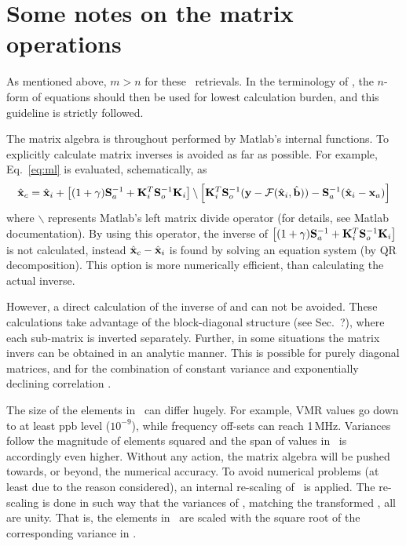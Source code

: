 \section{Some notes on the matrix operations}
\label{sec:matrixops}
%
As mentioned above, $m>n$ for these \smr\ retrievals. In the terminology of 
\citet{rodgers:00}, the $n$-form of equations should then be used for lowest
calculation burden, and this guideline is strictly followed.

The matrix algebra is throughout performed by Matlab's internal functions. To
explicitly calculate matrix inverses is avoided as far as possible. For
example, Eq.~\ref{eq:ml} is evaluated, schematically, as
\begin{displaymath}
  \hat{\mathbf{x}}_c = \hat{\mathbf{x}}_i + 
  \left[ (1+\gamma)\mathbf{S}_{a}^{-1} + 
          \mathbf{K}_{i}^T\mathbf{S}_{o}^{-1}\mathbf{K}_{i} \right] \backslash
  \left[ \mathbf{K}_{i}^T\mathbf{S}_{o}^{-1}(\mathbf{y}-\mathcal{F}(\hat{\mathbf{x}}_i,\hat{\mathbf{b}})) -
         \mathbf{S}_{a}^{-1}(\hat{\mathbf{x}}_i-\mathbf{x}_{a})\right]  
\end{displaymath}
where $\backslash$ represents Matlab's left matrix divide operator (for
details, see Matlab documentation). By using this operator, the inverse
of $\left[ (1+\gamma)\mathbf{S}_{a}^{-1} +
  \mathbf{K}_{i}^T\mathbf{S}_{o}^{-1}\mathbf{K}_{i} \right]$ is not calculated, instead
$\hat{\mathbf{x}}_c - \hat{\mathbf{x}}_i$ is found by solving an equation system (by QR
decomposition). This option is more numerically efficient, than calculating the
actual inverse.

However, a direct calculation of the inverse of  and  can
not be avoided. These calculations take advantage of the block-diagonal
structure (see Sec.~?), where each sub-matrix is inverted separately. Further,
in some situations the matrix invers can be obtained in an analytic manner.
This is possible for purely diagonal matrices, and for the combination of
constant variance and exponentially declining correlation
\citep[][Sec.~10.3.2.2]{rodgers:00}.

The size of the elements in \SttVct\ can differ hugely. For example, VMR values
go down to at least ppb level ($10^{-9}$), while frequency off-sets can reach
1\,MHz. Variances follow the magnitude of elements squared and the span of
values in \ is accordingly even higher. Without any action, the
matrix algebra will be pushed towards, or beyond, the numerical accuracy. To
avoid numerical problems (at least due to the reason considered), an internal
re-scaling of \SttVct\ is applied. The re-scaling is done in such way that the
variances of , matching the transformed \SttVct, all are unity. That
is, the elements in \SttVct\ are scaled with the square root of the
corresponding variance in .


